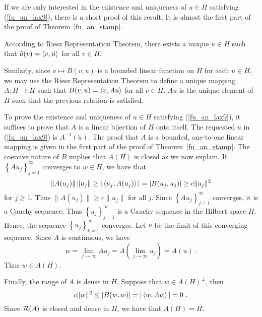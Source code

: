 \begin{rmk}
If we are only interested in the existence and uniqueness of $u\in H$
satisfying (\ref{fu_an_lax9}), there is a short proof of this result.
It is almost the first part of the proof of Theorem~\ref{fu_an_stamp}.
\label{fu_an_LaxMilgTh1}

According to Riesz Representation Theorem, there
exists a unique $\breve{u} \in H$ such that
$\displaystyle \tilde{u}(v) = \left\langle{v} , {\breve{u}}\right\rangle$ for all $v \in H$.

Similarly, since $v \mapsto B(v,u)$ is a bounded linear function on
$H$ for each $u\in H$, we may use the Riesz Representation Theorem
to define a unique mapping $A:H \rightarrow H$ such that
$\displaystyle B(v,u) = \left\langle{v} , {Au}\right\rangle$ for all $v \in H$.
$Au$ is the unique element of $H$ such that the previous relation is
satisfied.

To prove the existence and uniqueness of $u\in H$ satisfying
(\ref{fu_an_lax9}), it suffices to prove that $A$ is a linear bijection of
$H$ onto itself.  The requested $u$ in (\ref{fu_an_lax9}) is
$\displaystyle A^{-1}(\breve{u})$.  The proof that $A$ is a bounded, one-to-one
linear mapping is given in the first part of the proof of
Theorem~\ref{fu_an_stamp}.  The coercive nature of $B$ implies that
$A(H)$ is closed as we now explain.  If
$\displaystyle \left\{A u_j\right\}_{j=1}^\infty$ converges to
$w\in H$, we have that
\[
\|A(u_j)\|\,\|u_j\| \geq |\left\langle{u_j} , {A(u_j)}\right\rangle| = |B(u_j,u_j)| \geq c
\|u_j\|^2
\]
for $j \geq 1$.
Thus $\displaystyle \|A(u_j)\| \geq c \|u_j\|$ for all $j$.  Since 
$\displaystyle \left\{A u_j\right\}_{j=1}^\infty$ converges, it is a
Cauchy sequence.  Thus
$\displaystyle \left\{u_j\right\}_{j=1}^\infty$ is a Cauchy sequence 
in the Hilbert space $H$.  Hence, the sequence
$\displaystyle \left\{u_j\right\}_{k=1}^\infty$ converges.  Let $u$ be the
limit of this converging sequence.  Since $A$ is continuous, we have
\[
w = \lim_{j\rightarrow \infty} A u_{j}
= A\left( \lim_{j\rightarrow \infty} u_j\right) = A(u) \  .
\]
Thus $w \in A(H)$.

Finally, the range of $A$ is dense in $H$.  Suppose that
$\displaystyle w \in A(H)^\perp$,
then
\[
c \|w\|^2 \leq |B(w,w)| = |\left\langle{w} , {Aw}\right\rangle| = 0 \  .
\]
Since $\mathcal{R}(A)$ is closed and dense in $H$, we have that $A(H)=H$.
\end{rmk}

